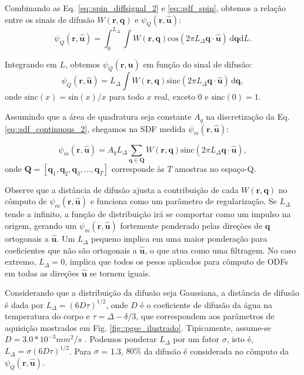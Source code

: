\documentclass[
    12pt,                %
    oneside,            %
    a4paper,            %
    english,            %
    french,                %
    spanish,            %
    brazil                %
    ]{abntex2}
\begin{document}
Combinando as Eq. \ref{eq::spin_diffsignal_2} e \ref{eq::sdf_spin}, obtemos a relação entre os sinais de difusão $W(\mathbf{r}, \mathbf{q})$ e $\psi_Q(\mathbf{r}, \mathbf{\hat{u}})$:
\begin{equation}
\label{eq::sdf_continuous_1}
    \psi_Q(\mathbf{r}, \mathbf{\hat{u}}) =
    \int_{0}^{L_{\Delta}}\int \! W(\mathbf{r}, \mathbf{q}) \text{cos}(2\pi L_{\Delta} \mathbf{q} \cdot \mathbf{\hat{u}}) \,\mathrm{d}\mathbf{q} \mathrm{d}L .
\end{equation}

Integrando em $L$, obtemos $\psi_Q(\mathbf{r}, \mathbf{\hat{u}})$ em função do sinal de difusão: 
\begin{equation}
\label{eq::sdf_continuous_2}
    \psi_Q(\mathbf{r}, \mathbf{\hat{u}}) =
    L_{\Delta} \int \! W(\mathbf{r}, \mathbf{q}) \text{sinc}(2\pi L_{\Delta} \mathbf{q} \cdot \mathbf{\hat{u}}) \,\mathrm{d}\mathbf{q} ,
\end{equation}
onde $\text{sinc}(x) = \text{sin}(x)/x$ para todo $x$ real, exceto $0$ e $\text{sinc}(0) = 1$.

Assumindo que a área de quadratura seja constante $A_q$ na discretização da Eq. \ref{eq::sdf_continuous_2}, chegamos na SDF medida $\psi_m(\mathbf{r}, \mathbf{\hat{u}})$: 


\begin{equation}
\label{eq::sdf_discrete_1}
    \psi_m(\mathbf{r}, \mathbf{\hat{u}}) =
     A_qL_{\Delta}\sum_{\mathbf{q} \in \mathbf{Q}} W(\mathbf{r}, \mathbf{q})\text{sinc}(2\pi L_{\Delta} \mathbf{q}\cdot\mathbf{\hat{u}}),
\end{equation}
onde $\mathbf{Q}= [
\mathbf{q}_1,
\mathbf{q}_2,
\mathbf{q}_3, ...,
\mathbf{q}_T
]$ corresponde às $T$ amostras no espaço-Q.

Observe que a distância de difusão ajusta a contribuição de cada $W(\mathbf{r}, \mathbf{q})$ no cômputo de $\psi_m(\mathbf{r}, \mathbf{\hat{u}})$ e funciona como um parâmetro de regularização. Se $L_{\Delta}$ tende a infinito, a função de distribuição irá se comportar como um impulso na origem, gerando um $\psi_m(\mathbf{r}, \mathbf{\hat{u}})$ fortemente ponderado pelas direções de $\mathbf{q}$ ortogonais a $\mathbf{\hat{u}}$. Um $L_{\Delta}$ pequeno implica em uma maior ponderação para coeficientes que não são ortogonais a $\mathbf{\hat{u}}$, o que atua como uma filtragem. No caso extremo, $L_{\Delta} = 0$, implica que todos os pesos aplicados para cômputo de ODFs em todas as direções $\mathbf{\hat{u}}$ se tornem iguais.

Considerando que a distribuição da difusão seja Gaussiana, a distância de difusão é dada por $L_{\Delta}=(6D\tau)^{1/2}$, onde $D$ é o coeficiente de difusão da água na temperatura do corpo e $\tau = \Delta - \delta/3$, que correspondem aos parâmetros de aquisição mostrados em Fig. \ref{fig::pgse_ilustrado}. 
Tipicamente, assume-se $D = 3.0*10^{-3} mm^2/s$ \cite{yeh2019_DSI}. Podemos ponderar $L_{\Delta}$ por um fator $\sigma$, isto é, $L_{\Delta} = \sigma(6D\tau)^{1/2}$. Para $\sigma$ = 1.3, $80\%$ da difusão é considerada no cômputo da $\psi_Q(\mathbf{r}, \mathbf{\hat{u}})$.
\end{document}
